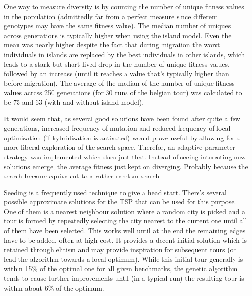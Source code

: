 \par\noindent One way to measure diversity is by counting the number of unique fitness values in the population (admittedly far from a perfect measure since different genotypes may have the same fitness value). The median number of uniques across generations is typically higher when using the island model. Even the mean was nearly higher despite the fact that during migration the worst individuals in islands are replaced by the best individuals in other islands, which leads to a stark but short-lived drop in the number of unique fitness values, followed by an increase (until it reaches a value that's typically higher than before migration). The average of the median of the number of unique fitness values across 250 generations (for 30 runs of the belgian tour) was calculated to be 75 and 63 (with and without island model).



It would seem that, as several good solutions have been found after quite a few generations, increased frequency of mutation and reduced frequency of local optimisation (if hybridisation is activated) would prove useful by allowing for a more liberal exploration of the search space. Therefor, an adaptive parameter strategy was implemented which does just that. Instead of seeing interesting new solutions emerge, the average fitness just kept on diverging. Probably because the search became equivalent to a rather random search.


Seeding is a frequently used technique to give a head start. There's several possible approximate solutions for the TSP that can be used for this purpose. One of them is a nearest neighbour solution where a random city is picked and a tour is formed by repeatedly selecting the city nearest to the current one until all of them have been selected. This works well until at the end the remaining edges have to be added, often at high cost. It provides a decent initial solution which is retained through elitism and may provide inspiration for subsequent tours (or lead the algorithm towards a local optimum). While this initial tour generally is within 15\% of the optimal one for all given benchmarks, the genetic algorithm tends to cause further improvements until (in a typical run) the resulting tour is within about 6\% of the optimum. \\


